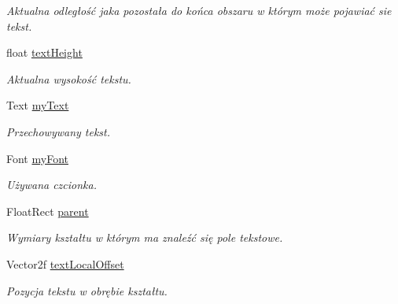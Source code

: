 \begin{DoxyCompactItemize}
\begin{DoxyCompactList}\small\item\em Aktualna odległość jaka pozostała do końca obszaru w którym może pojawiać sie tekst. \end{DoxyCompactList}\item 
\mbox{\label{class_contain_text_a267efe98beee438b2204817907d8bd17}} 
float \mbox{\hyperlink{class_contain_text_a267efe98beee438b2204817907d8bd17}{text\+Height}}
\begin{DoxyCompactList}\small\item\em Aktualna wysokość tekstu. \end{DoxyCompactList}\item 
\mbox{\label{class_contain_text_a865c7b9cc3c1e2fab3f496571d95c119}} 
Text \mbox{\hyperlink{class_contain_text_a865c7b9cc3c1e2fab3f496571d95c119}{my\+Text}}
\begin{DoxyCompactList}\small\item\em Przechowywany tekst. \end{DoxyCompactList}\item 
\mbox{\label{class_contain_text_adf6317c8abd3b55973f0897c492c0a74}} 
Font \mbox{\hyperlink{class_contain_text_adf6317c8abd3b55973f0897c492c0a74}{my\+Font}}
\begin{DoxyCompactList}\small\item\em Używana czcionka. \end{DoxyCompactList}\item 
\mbox{\label{class_contain_text_a39a0ae330452181781328f3446d36c24}} 
Float\+Rect \mbox{\hyperlink{class_contain_text_a39a0ae330452181781328f3446d36c24}{parent}}
\begin{DoxyCompactList}\small\item\em Wymiary kształtu w którym ma znaleźć się pole tekstowe. \end{DoxyCompactList}\item 
\mbox{\label{class_contain_text_a7169f733415e27e7400a72c35fd0380c}} 
Vector2f \mbox{\hyperlink{class_contain_text_a7169f733415e27e7400a72c35fd0380c}{text\+Local\+Offset}}
\begin{DoxyCompactList}\small\item\em Pozycja tekstu w obrębie kształtu. \end{DoxyCompactList}\item 

\end{DoxyCompactItemize}
